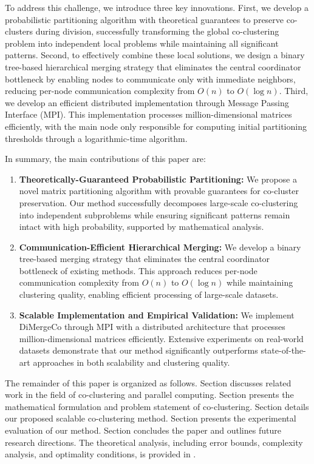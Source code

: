 \documentclass[journal]{IEEEtran}
\begin{document}
To address this challenge, we introduce three key innovations. First, we develop a probabilistic partitioning algorithm with theoretical guarantees to preserve co-clusters during division, successfully transforming the global co-clustering problem into independent local problems while maintaining all significant patterns. Second, to effectively combine these local solutions, we design a binary tree-based hierarchical merging strategy that eliminates the central coordinator bottleneck by enabling nodes to communicate only with immediate neighbors, reducing per-node communication complexity from $O(n)$ to $O(\log n)$. Third, we develop an efficient distributed implementation through Message Passing Interface (MPI). This implementation processes million-dimensional matrices efficiently, with the main node only responsible for computing initial partitioning thresholds through a logarithmic-time algorithm.

In summary, the main contributions of this paper are:
\begin{enumerate}
    \item \textbf{Theoretically-Guaranteed Probabilistic Partitioning:} We propose a novel matrix partitioning algorithm with provable guarantees for co-cluster preservation. Our method successfully decomposes large-scale co-clustering into independent subproblems while ensuring significant patterns remain intact with high probability, supported by mathematical analysis.

    \item \textbf{Communication-Efficient Hierarchical Merging:} We develop a binary tree-based merging strategy that eliminates the central coordinator bottleneck of existing methods. This approach reduces per-node communication complexity from $O(n)$ to $O(\log n)$ while maintaining clustering quality, enabling efficient processing of large-scale datasets.

    \item \textbf{Scalable Implementation and Empirical Validation:} We implement DiMergeCo through MPI with a distributed architecture that processes million-dimensional matrices efficiently. Extensive experiments on real-world datasets demonstrate that our method significantly outperforms state-of-the-art approaches in both scalability and clustering quality.
\end{enumerate}

The remainder of this paper is organized as follows. Section  discusses related work in the field of co-clustering and parallel computing. Section  presents the mathematical formulation and problem statement of co-clustering. Section  details our proposed scalable co-clustering method.
Section  presents the experimental evaluation of our method. Section  concludes the paper and outlines future research directions. The theoretical analysis, including error bounds, complexity analysis, and optimality conditions, is provided in .
\end{document}
